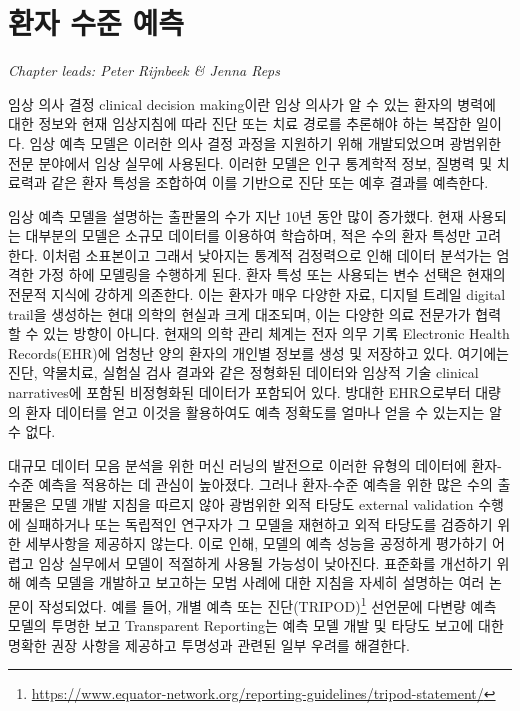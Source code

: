 \documentclass[10.5pt]{book}
\let\rmarkdownfootnote\footnote%
\def\footnote{\protect\rmarkdownfootnote}
\theoremstyle{definition}
\theoremstyle{definition}
\theoremstyle{definition}
\theoremstyle{remark}
\begin{document}
\chapter{환자 수준 예측}\label{PatientLevelPrediction}

\emph{Chapter leads: Peter Rijnbeek \& Jenna Reps}


임상 의사 결정 clinical decision making이란 임상 의사가 알 수 있는
환자의 병력에 대한 정보와 현재 임상지침에 따라 진단 또는 치료 경로를
추론해야 하는 복잡한 일이다. 임상 예측 모델은 이러한 의사 결정 과정을
지원하기 위해 개발되었으며 광범위한 전문 분야에서 임상 실무에 사용된다.
이러한 모델은 인구 통계학적 정보, 질병력 및 치료력과 같은 환자 특성을
조합하여 이를 기반으로 진단 또는 예후 결과를 예측한다.
 

임상 예측 모델을 설명하는 출판물의 수가 지난 10년 동안 많이 증가했다.
현재 사용되는 대부분의 모델은 소규모 데이터를 이용하여 학습하며, 적은
수의 환자 특성만 고려한다. 이처럼 소표본이고 그래서 낮아지는 통계적
검정력으로 인해 데이터 분석가는 엄격한 가정 하에 모델링을 수행하게 된다.
환자 특성 또는 사용되는 변수 선택은 현재의 전문적 지식에 강하게
의존한다. 이는 환자가 매우 다양한 자료, 디지털 트레일 digital trail을
생성하는 현대 의학의 현실과 크게 대조되며, 이는 다양한 의료 전문가가
협력할 수 있는 방향이 아니다. 현재의 의학 관리 체계는 전자 의무 기록
Electronic Health Records(EHR)에 엄청난 양의 환자의 개인별 정보를 생성
및 저장하고 있다. 여기에는 진단, 약물치료, 실험실 검사 결과와 같은
정형화된 데이터와 임상적 기술 clinical narratives에 포함된 비정형화된
데이터가 포함되어 있다. 방대한 EHR으로부터 대량의 환자 데이터를 얻고
이것을 활용하여도 예측 정확도를 얼마나 얻을 수 있는지는 알 수 없다.

대규모 데이터 모음 분석을 위한 머신 러닝의 발전으로 이러한 유형의
데이터에 환자-수준 예측을 적용하는 데 관심이 높아졌다. 그러나 환자-수준
예측을 위한 많은 수의 출판물은 모델 개발 지침을 따르지 않아 광범위한
외적 타당도 external validation 수행에 실패하거나 또는 독립적인 연구자가
그 모델을 재현하고 외적 타당도를 검증하기 위한 세부사항을 제공하지
않는다. 이로 인해, 모델의 예측 성능을 공정하게 평가하기 어렵고 임상
실무에서 모델이 적절하게 사용될 가능성이 낮아진다. 표준화를 개선하기
위해 예측 모델을 개발하고 보고하는 모범 사례에 대한 지침을 자세히
설명하는 여러 논문이 작성되었다. 예를 들어, 개별 예측 또는
진단(TRIPOD)\footnote{\url{https://www.equator-network.org/reporting-guidelines/tripod-statement/}}
선언문에 다변량 예측 모델의 투명한 보고 Transparent Reporting는 예측
모델 개발 및 타당도 보고에 대한 명확한 권장 사항을 제공하고 투명성과
관련된 일부 우려를 해결한다.  
\end{document}
